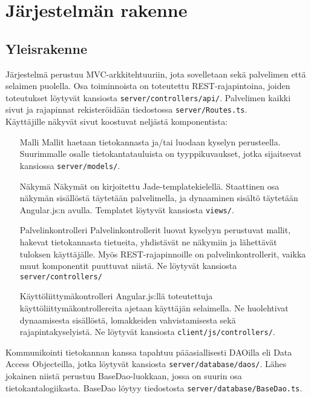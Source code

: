 \chapter{Järjestelmän rakenne}

\section{Yleisrakenne}

Järjestelmä perustuu MVC-arkkitehtuuriin, jota sovelletaan sekä palvelimen että selaimen puolella. Osa toiminnoista on toteutettu REST-rajapintoina, joiden toteutukset löytyvät kansiosta \texttt{server/controllers/api/}. Palvelimen kaikki sivut ja rajapinnat rekisteröidään tiedostossa \texttt{server/Routes.ts}.\\

\noindent
Käyttäjille näkyvät sivut koostuvat neljästä komponentista:

\begin{itemize}
	\item[Malli] Mallit haetaan tietokannasta ja/tai luodaan kyselyn perusteella. Suurimmalle osalle tietokantatauluista on tyyppikuvaukset, jotka sijaitsevat kansiossa \texttt{server/models/}.
	\item[Näkymä] Näkymät on kirjoitettu Jade-templatekielellä. Staattinen osa näkymän sisällöstä täytetään palvelimella, ja dynaaminen sisältö täytetään Angular.js:n avulla. Templatet löytyvät kansiosta \texttt{views/}.
	\item[Palvelinkontrolleri] Palvelinkontrollerit luovat kyselyyn perustuvat mallit, hakevat tietokannasta tietueita, yhdistävät ne näkymiin ja lähettävät tuloksen käyttäjälle. Myös REST-rajapinnoille on palvelinkontrollerit, vaikka muut komponentit puuttuvat niistä. Ne löytyvät kansiosta \texttt{server/controllers/}
	\item[Käyttöliittymäkontrolleri] Angular.js:llä toteutettuja käyttöliittymäkontrollereita ajetaan käyttäjän selaimella. Ne huolehtivat dynaamisesta sisällöstä, lomakkeiden vahvistamisesta sekä rajapintakyselyistä. Ne löytyvät kansiosta \texttt{client/js/controllers/}.
\end{itemize}

\noindent
Kommunikointi tietokannan kanssa tapahtuu pääasiallisesti DAOilla eli Data Access Objecteilla, jotka löytyvät kansiosta \texttt{server/database/daos/}. Lähes jokainen niistä perustuu BaseDao-luokkaan, jossa on suurin osa tietokantalogiikasta. BaseDao löytyy tiedostosta \texttt{server/database/BaseDao.ts}.

